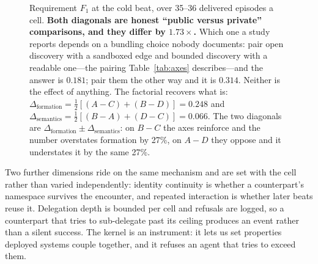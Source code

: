 \begin{figure}[t]
\caption{Requirement $F_1$ at the cold beat, over 35--36 delivered episodes a cell.
\textbf{Both diagonals are honest ``public versus private'' comparisons, and they differ by
$1.73\times$.} Which one a study reports depends on a bundling choice nobody documents: pair
open discovery with a sandboxed edge and bounded discovery with a readable one---the pairing
Table~\ref{tab:axes} describes---and the answer is $0.181$; pair them the other way and it is
$0.314$. Neither is the effect of anything. The factorial recovers what is:
$\Delta_\text{formation} = \frac{1}{2}[(A-C)+(B-D)] = 0.248$ and $\Delta_\text{semantics} =
\frac{1}{2}[(B-A)+(D-C)] = 0.066$. The two diagonals are $\Delta_\text{formation} \pm
\Delta_\text{semantics}$: on $B-C$ the axes reinforce and the number overstates formation by
27\%, on $A-D$ they oppose and it understates it by the same 27\%.}
\label{fig:twobytwo}
\end{figure}

Two further dimensions ride on the same mechanism and are set with the cell rather than
varied independently: identity continuity is whether a counterpart's namespace survives
the encounter, and repeated interaction is whether later beats reuse it. Delegation
depth is bounded per cell and refusals are logged, so a counterpart that tries to
sub-delegate past its ceiling produces an event rather than a silent success. The
kernel is an instrument: it lets us set properties deployed systems couple together,
and it refuses an agent that tries to exceed them.
